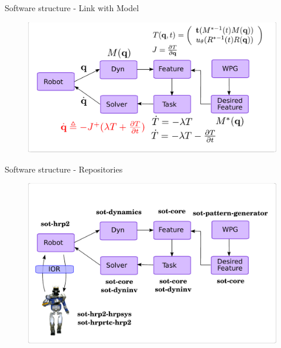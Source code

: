 \begin{frame}{Software structure - Link with Model}
  \begin{figure}
    \includegraphics[width=\linewidth]{./figures/Concept-Theory-Fig-Finalv2}
  \end{figure}
\end{frame}

\begin{frame}{Software structure - Repositories}
  \begin{figure}
    \includegraphics[width=\linewidth]{./figures/Concept-Software-Fig}
  \end{figure}
\end{frame}

